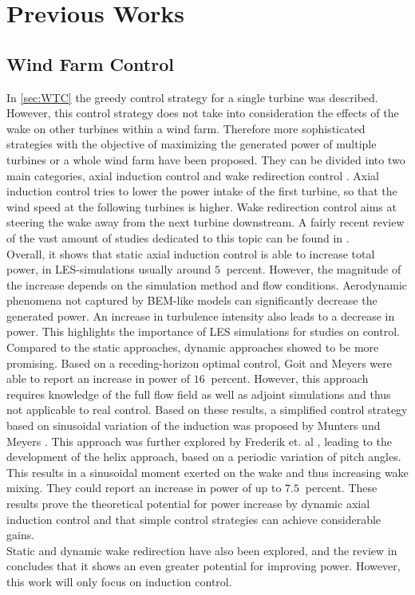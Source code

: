 \section{Previous Works}
\subsection{Wind Farm Control}
In \autoref{sec:WTC} the greedy control strategy for a single turbine was described. However, this control strategy does not take into consideration the effects of the wake on other turbines within a wind farm. Therefore more sophisticated strategies with the objective of maximizing the generated power of multiple turbines or a whole wind farm have been proposed. They can be divided into two main categories, axial induction control and wake redirection control \cite{boersma_tutorial_2017}.
Axial induction control tries to lower the power intake of the first turbine, so that the wind speed at the following turbines is higher. Wake redirection control aims at steering the wake away from the next turbine downstream. A fairly recent review of the vast amount of studies dedicated to this topic can be found in \cite{kheirabadi_quantitative_2019}. \\
Overall, it shows that static axial induction control is able to increase total power, in LES-simulations usually around $\SI{5}{}$ percent. However, the magnitude of the increase depends on the simulation method and flow conditions. Aerodynamic phenomena not captured by BEM-like models can significantly decrease the generated power. An increase in turbulence intensity also leads to a decrease in power. This highlights the importance of LES simulations for studies on control.
Compared to the static approaches, dynamic approaches showed to be more promising. Based on a receding-horizon optimal control, Goit and Meyers \cite{goit_optimal_2015} were able to report an increase in power of $\SI{16}{}$ percent. However, this approach requires knowledge of the full flow field as well as adjoint simulations and thus not applicable to real control. Based on these results, a simplified control strategy based on sinusoidal variation of the induction was proposed by Munters und Meyers \cite{munters_towards_2018}. This approach was further explored by Frederik et. al \cite{frederik_helix_2020}, leading to the development of the helix approach, based on a periodic variation of pitch angles. This results in a sinusoidal moment exerted on the wake and thus increasing wake mixing. They could report an increase in power of up to $\SI{7.5}{}$ percent. These results prove the theoretical potential for power increase by dynamic axial induction control and that simple control strategies can achieve considerable gains. \\
Static and dynamic wake redirection have also been explored, and the review in \cite{kheirabadi_quantitative_2019} concludes that it shows an even greater potential for improving power. However, this work will only focus on induction control.
